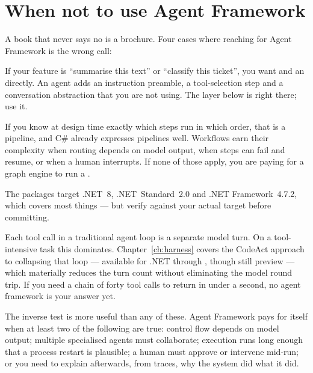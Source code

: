 \section{When not to use Agent Framework}
\label{sec:when-not}

A book that never says no is a brochure. Four cases where reaching for Agent
Framework is the wrong call:

\begin{description}[leftmargin=0pt, style=nextline]
\item[You need one model call.] If your feature is ``summarise this text'' or
``classify this ticket'', you want  and an
 directly. An agent adds an instruction preamble, a tool-selection
step and a conversation abstraction that you are not using. The layer below is
right there; use it.

\item[Your control flow is deterministic.] If you know at design time exactly
which steps run in which order, that is a pipeline, and C\# already expresses
pipelines well. Workflows earn their complexity when routing depends on model
output, when steps can fail and resume, or when a human interrupts. If none of
those apply, you are paying for a graph engine to run a .

\item[You are locked to a runtime Agent Framework does not target.] The packages
target .NET~8, .NET~Standard~2.0 and .NET Framework~4.7.2, which covers most
things --- but verify against your actual target before committing.

\item[Latency is your binding constraint and your task is tool-heavy.] Each
tool call in a traditional agent loop is a separate model turn. On a
tool-intensive task this dominates. Chapter~\ref{ch:harness} covers the CodeAct
approach to collapsing that loop --- available for .NET through
, though still preview --- which materially
reduces the turn count without eliminating the model round trip. If you need a
chain of forty tool calls to return in under a second, no agent framework is your
answer yet.
\end{description}

\begin{note}
The inverse test is more useful than any of these. Agent Framework pays for
itself when at least two of the following are true: control flow depends on model
output; multiple specialised agents must collaborate; execution runs long enough
that a process restart is plausible; a human must approve or intervene mid-run;
or you need to explain afterwards, from traces, why the system did what it did.
\end{note}

